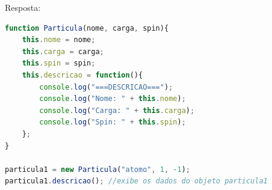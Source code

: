 \documentclass[12pt,a4paper,oneside]{article}
\begin{document}
\begin{enumerate}
	\vspace{0.3cm}
	
	{\color{blue} Resposta: }

	\begin{lstlisting}[language=JavaScript]
function Particula(nome, carga, spin){
	this.nome = nome;
	this.carga = carga;
	this.spin = spin;
	this.descricao = function(){
		console.log("===DESCRICAO===");
		console.log("Nome: " + this.nome);
		console.log("Carga: " + this.carga);
		console.log("Spin: " + this.spin);
	};
}

particula1 = new Particula("atomo", 1, -1);
particula1.descricao();	//exibe os dados do objeto particula1
\end{lstlisting}
	
	\end{enumerate}
\end{document}
